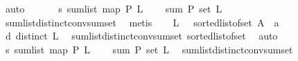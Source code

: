 \begin{isabellebody}
\ auto\isanewline
\ \ \ \isamarkupfalse%
\ \isamarkupfalse%
\ s{\isacharunderscore}{\kern0pt}{}{\isacharcolon}{\kern0pt}\ {\isachardoublequoteopen}sum{\isacharunderscore}{\kern0pt}list\ {\isacharparenleft}{\kern0pt}{\isacharparenleft}{\kern0pt}map\ P{\isacharparenright}{\kern0pt}\ {\isacharquery}{\kern0pt}L{}{\isacharparenright}{\kern0pt}\ \isanewline
\ \ {\isacharequal}{\kern0pt}\ sum\ P\ {\isacharparenleft}{\kern0pt}set\ {\isacharquery}{\kern0pt}L{}{\isacharparenright}{\kern0pt}{\isachardoublequoteclose}\ \isamarkupfalse%
\ sum{\isacharunderscore}{\kern0pt}list{\isacharunderscore}{\kern0pt}distinct{\isacharunderscore}{\kern0pt}conv{\isacharunderscore}{\kern0pt}sum{\isacharunderscore}{\kern0pt}set\ \isamarkupfalse%
\ metis\isanewline
\ \ \isamarkupfalse%
\ {\isacharquery}{\kern0pt}L{}\ {\isacharequal}{\kern0pt}\ {\isachardoublequoteopen}\ {\isacharparenleft}{\kern0pt}sorted{\isacharunderscore}{\kern0pt}list{\isacharunderscore}{\kern0pt}of{\isacharunderscore}{\kern0pt}set\ {\isacharparenleft}{\kern0pt}A\ {\isacharminus}{\kern0pt}\ {\isacharbraceleft}{\kern0pt}a{\isacharbraceright}{\kern0pt}{\isacharparenright}{\kern0pt}{\isacharparenright}{\kern0pt}{\isachardoublequoteclose}\isanewline
\ \ \isamarkupfalse%
\ d{\isacharunderscore}{\kern0pt}{}{\isacharcolon}{\kern0pt}\ {\isachardoublequoteopen}distinct\ {\isacharquery}{\kern0pt}L{}{\isachardoublequoteclose}\ \isamarkupfalse%
\ sum{\isacharunderscore}{\kern0pt}list{\isacharunderscore}{\kern0pt}distinct{\isacharunderscore}{\kern0pt}conv{\isacharunderscore}{\kern0pt}sum{\isacharunderscore}{\kern0pt}set\ sorted{\isacharunderscore}{\kern0pt}list{\isacharunderscore}{\kern0pt}of{\isacharunderscore}{\kern0pt}set{\isacharparenleft}{\kern0pt}{}{\isacharparenright}{\kern0pt}\ \isamarkupfalse%
\ auto\isanewline
\ \ \isamarkupfalse%
\ \isamarkupfalse%
\ s{\isacharunderscore}{\kern0pt}{}{\isacharcolon}{\kern0pt}\ {\isachardoublequoteopen}sum{\isacharunderscore}{\kern0pt}list\ {\isacharparenleft}{\kern0pt}{\isacharparenleft}{\kern0pt}map\ P{\isacharparenright}{\kern0pt}\ {\isacharquery}{\kern0pt}L{}{\isacharparenright}{\kern0pt}\ \isanewline
\ \ {\isacharequal}{\kern0pt}\ sum\ P\ {\isacharparenleft}{\kern0pt}set\ {\isacharquery}{\kern0pt}L{}{\isacharparenright}{\kern0pt}{\isachardoublequoteclose}\ \isamarkupfalse%
\ sum{\isacharunderscore}{\kern0pt}list{\isacharunderscore}{\kern0pt}distinct{\isacharunderscore}{\kern0pt}conv{\isacharunderscore}{\kern0pt}sum{\isacharunderscore}{\kern0pt}set\ \isamarkupfalse%

\end{isabellebody}
